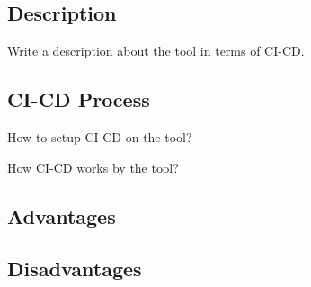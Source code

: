 \subsection{Description}
%
Write a description about the tool in terms of CI-CD.
%
\subsection{CI-CD Process}
%
How to setup CI-CD on the tool?

How CI-CD works by the tool?
%
\subsection{Advantages}
%
\subsection{Disadvantages}